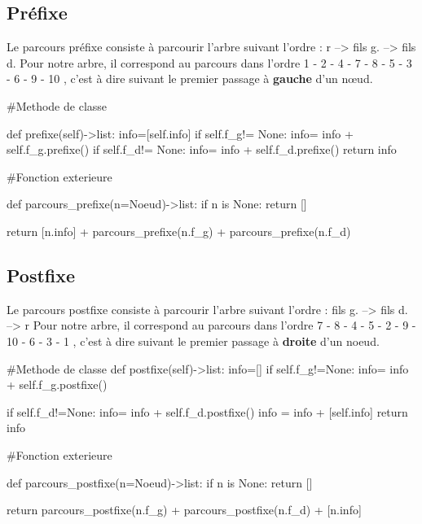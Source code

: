 \documentclass{article}
\begin{document}
\subsection{Préfixe}
Le parcours préfixe consiste à parcourir l'arbre suivant l'ordre : r --> fils g. --> fils d.
 Pour notre arbre, il correspond au parcours dans 
 l’ordre 1 - 2 - 4 - 7 - 8 - 5 - 3 - 6 - 9 - 10 , 
 c’est à dire suivant le premier passage à \textbf{gauche} d’un nœud.
\begin{python}
    #Methode de classe

    def prefixe(self)->list:
        info=[self.info]
        if self.f_g!= None:
            info= info + self.f_g.prefixe()
        if self.f_d!= None:
            info= info + self.f_d.prefixe() 
        return info

    #Fonction exterieure

    def parcours_prefixe(n=Noeud)->list:
        if n is None:
            return []
        
        return [n.info] + parcours_prefixe(n.f_g) + parcours_prefixe(n.f_d)


\end{python}
\subsection{Postfixe}
Le parcours postfixe consiste à parcourir l'arbre suivant l'ordre : fils g. --> fils d. --> r
 Pour notre arbre, il correspond au parcours dans 
 l’ordre 7 - 8 - 4 - 5 - 2 - 9 - 10 - 6 - 3 - 1 ,
 c'est à dire suivant le premier passage à \textbf{droite} d'un noeud.

\begin{python}
    #Methode de classe
    def postfixe(self)->list:
        info=[]
        if self.f_g!=None:
            info= info + self.f_g.postfixe()  
            
        if self.f_d!=None:
            info= info + self.f_d.postfixe()
        info = info + [self.info]
        return info

    #Fonction exterieure

    def parcours_postfixe(n=Noeud)->list:
        if n is None:
            return []
        
        return parcours_postfixe(n.f_g) + parcours_postfixe(n.f_d) + [n.info]
\end{python}
\newpage
\end{document}
